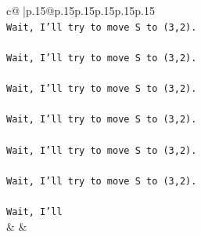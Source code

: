 \documentclass{article}
\begin{document}
{\begin{supertabular}{c@{$\;$}|p{.15\linewidth}@{}p{.15\linewidth}p{.15\linewidth}p{.15\linewidth}p{.15\linewidth}p{.15\linewidth}}
{{{\\ 
\texttt{Wait, I'll try to move S to (3,2).} \\
\\ 
\texttt{Wait, I'll try to move S to (3,2).} \\
\\ 
\texttt{Wait, I'll try to move S to (3,2).} \\
\\ 
\texttt{Wait, I'll try to move S to (3,2).} \\
\\ 
\texttt{Wait, I'll try to move S to (3,2).} \\
\\ 
\texttt{Wait, I'll try to move S to (3,2).} \\
\\ 
\texttt{Wait, I'll} \\
            }
        }
    }
    & & \\ \\


\end{supertabular}}
\end{document}
